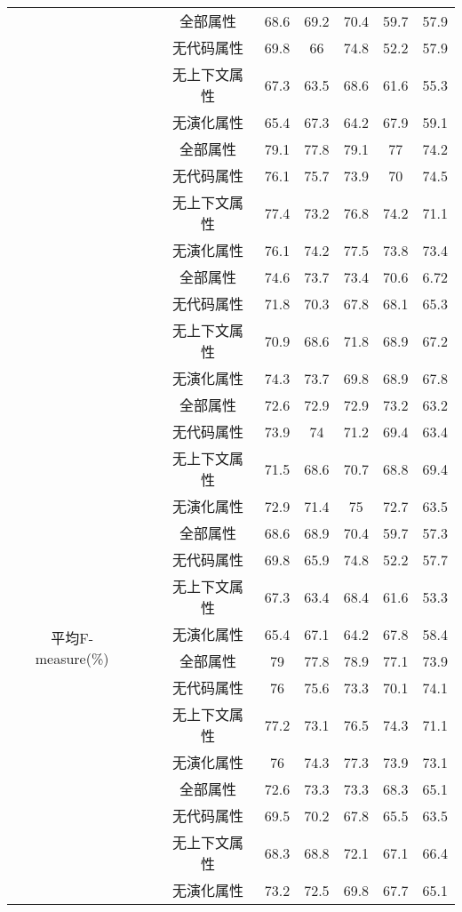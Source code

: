 \begin{table} [htbp]
\begin{tabular}{cccccccc}
\cline{2-8}
&~\multirow{4}{*}{jEdit}
&全部属性     & 68.6    & 69.2  & 70.4 & 59.7 & 57.9 \\
&&无代码属性  & 69.8    & 66   & 74.8 & 52.2 & 57.9 \\
&&无上下文属性  & 67.3    &63.5  & 68.6 & 61.6 & 55.3 \\
&&无演化属性& 65.4    & 67.3  & 64.2 & 67.9 & 59.1 \\
\cline{2-8}
&~\multirow{4}{*}{jFreeChart} 
&全部属性     & 79.1    & 77.8  & 79.1 & 77  & 74.2 \\
&&无代码属性  & 76.1    & 75.7  & 73.9 & 70   & 74.5 \\
&&无上下文属性  & 77.4    & 73.2  & 76.8 & 74.2 & 71.1 \\
&&无演化属性& 76.1    & 74.2  & 77.5 & 73.8 & 73.4 \\
\cline{2-8}
&~\multirow{4}{*}{Tuxguitar} 
&全部属性   & 74.6    & 73.7  & 73.4 & 70.6 & 6.72 \\
&&无代码属性  & 71.8    & 70.3  & 67.8 & 68.1 & 65.3 \\
&&无上下文属性  & 70.9    & 68.6  & 71.8 & 68.9 & 67.2 \\
&&无演化属性& 74.3    & 73.7  & 69.8 & 68.9 & 67.8 \\
\hline
\multirow{16}{*}{平均F-measure(\%)}
&~\multirow{4}{*}{ArgoUML}
&全部属性     & 72.6    & 72.9  & 72.9 & 73.2 & 63.2 \\
&&无代码属性& 73.9    & 74   & 71.2 & 69.4 & 63.4 \\
&&无上下文属性   & 71.5    & 68.6  & 70.7 & 68.8 & 69.4 \\
&&无演化属性& 72.9    & 71.4  & 75  & 72.7 & 63.5 \\
\cline{2-8}
&~\multirow{4}{*}{jEdit} 
&全部属性      & 68.6    & 68.9  & 70.4 & 59.7 & 57.3 \\
&&无代码属性 & 69.8    & 65.9  & 74.8 & 52.2 & 57.7 \\
&&无上下文属性   & 67.3    & 63.4  & 68.4 & 61.6 & 53.3 \\
&&无演化属性& 65.4    & 67.1  & 64.2 & 67.8 & 58.4 \\
\cline{2-8}
&~\multirow{4}{*}{jFreeChart} 
&全部属性      & 79     & 77.8  & 78.9 & 77.1 & 73.9 \\
&&无代码属性 & 76     & 75.6  & 73.3 & 70.1 & 74.1 \\
&&无上下文属性   & 77.2    & 73.1  & 76.5 & 74.3 & 71.1 \\
&&无演化属性& 76     & 74.3  & 77.3 & 73.9 & 73.1 \\
\cline{2-8}
&~\multirow{4}{*}{Tuxguitar} 
&全部属性         & 72.6    &73.3  & 73.3 & 68.3 & 65.1 \\
&&无代码属性 & 69.5    & 70.2  & 67.8 & 65.5 & 63.5 \\
&&无上下文属性   & 68.3    & 68.8  & 72.1 & 67.1 & 66.4 \\
&&无演化属性& 73.2    & 72.5  & 69.8 & 67.7 & 65.1\\
\bottomrule[1.5pt]
\end{tabular}
\end{table} 

